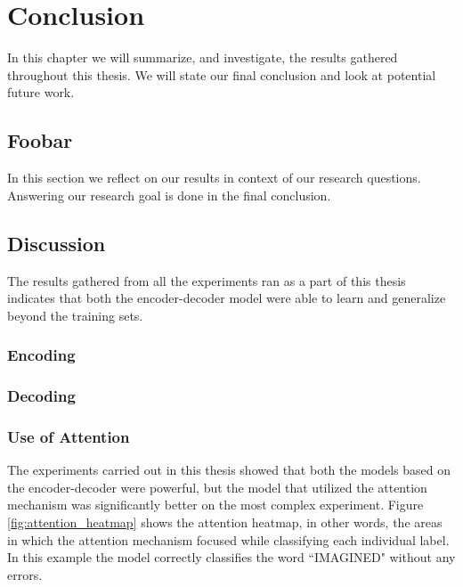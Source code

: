 
\chapter{Conclusion}
\label{ch:conclusion}
In this chapter we will summarize, and investigate, the results gathered throughout this thesis. We will state our final conclusion and look at potential future work.


\section{Foobar}
In this section we reflect on our results in context of our research questions. Answering our research goal is done in the final conclusion.



\section{Discussion}
The results gathered from all the experiments ran as a part of this thesis indicates that both the encoder-decoder model were able to learn and generalize beyond the training sets.

\subsection{Encoding}

\subsection{Decoding}

\subsection{Use of Attention}
The experiments carried out in this thesis showed that both the models based on the encoder-decoder were powerful, but the model that utilized the attention mechanism was significantly better on the most complex experiment. Figure \ref{fig:attention_heatmap} shows the attention heatmap, in other words, the areas in which the attention mechanism focused while classifying each individual label. In this example the model correctly classifies the word ``IMAGINED" without any errors. 


